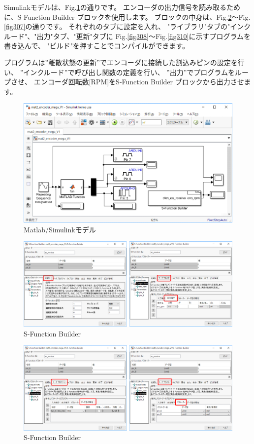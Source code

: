 Simulinkモデルは、Fig.\ref{fig303}の通りです。
エンコーダの出力信号を読み取るために、S-Function Builder ブロックを使用します。
ブロックの中身は、Fig.\ref{fig304}～Fig.\ref{fig307}の通りです。
それぞれのタブに設定を入れ、
"ライブラリ"タブの"インクルード"、"出力"タブ、"更新"タブに
Fig.\ref{fig308}～Fig.\ref{fig310}に示すプログラムを書き込んで、
"ビルド"を押すことでコンパイルができます。

プログラムは”離散状態の更新”でエンコーダに接続した割込みピンの設定を行い、
”インクルード”で呼び出し関数の定義を行い、
”出力”でプログラムをループさせ、
エンコーダ回転数[RPM]をS-Function Builder ブロックから出力させます。

\begin{figure}[htbp]
    \centering
    \includegraphics[width=380pt]{fig/fig303.eps}
    \caption{Matlab/Simulinkモデル}
    \label{fig303}
\end{figure}

\begin{figure}[htbp]
    \centering
    \includegraphics[width=380pt]{fig/fig304.eps}
    \caption{S-Function Builder}
    \label{fig304}
\end{figure}

\begin{figure}[htbp]
    \centering
    \includegraphics[width=380pt]{fig/fig305.eps}
    \caption{S-Function Builder}
    \label{fig305}
\end{figure}

